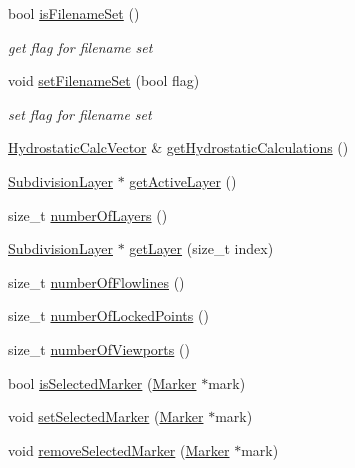 \begin{DoxyCompactItemize}
bool \hyperlink{classShipCAD_1_1ShipCADModel_af63013461d2ef6ee7221d72a42949d7c}{is\-Filename\-Set} ()
\begin{DoxyCompactList}\small\item\em get flag for filename set \end{DoxyCompactList}\item 
void \hyperlink{classShipCAD_1_1ShipCADModel_a960f3e97ef2aa847c9bb7cdc7731cd39}{set\-Filename\-Set} (bool flag)
\begin{DoxyCompactList}\small\item\em set flag for filename set \end{DoxyCompactList}\item 
\hyperlink{namespaceShipCAD_a0c7b012d8868cbb43871cf0bf303ccc6}{Hydrostatic\-Calc\-Vector} \& \hyperlink{classShipCAD_1_1ShipCADModel_aafc30dd7d6b9db4ccfc7bf1c4e2b3b11}{get\-Hydrostatic\-Calculations} ()
\item 
\hyperlink{classShipCAD_1_1SubdivisionLayer}{Subdivision\-Layer} $\ast$ \hyperlink{classShipCAD_1_1ShipCADModel_a5aa1e9aa14350f2e0980112a81613ca6}{get\-Active\-Layer} ()
\item 
size\-\_\-t \hyperlink{classShipCAD_1_1ShipCADModel_afb23b08b1014fc176ff864b8f154a84b}{number\-Of\-Layers} ()
\item 
\hyperlink{classShipCAD_1_1SubdivisionLayer}{Subdivision\-Layer} $\ast$ \hyperlink{classShipCAD_1_1ShipCADModel_ae13e425deb59f7b4f0c95cc02230f097}{get\-Layer} (size\-\_\-t index)
\item 
size\-\_\-t \hyperlink{classShipCAD_1_1ShipCADModel_afdb9bccb1cf9e3bf8aa853d81ff11d39}{number\-Of\-Flowlines} ()
\item 
size\-\_\-t \hyperlink{classShipCAD_1_1ShipCADModel_afb8cc5aaf19a6c1c687550fd9de1739e}{number\-Of\-Locked\-Points} ()
\item 
size\-\_\-t \hyperlink{classShipCAD_1_1ShipCADModel_a099d0530e99261318f6332220a331010}{number\-Of\-Viewports} ()
\item 
bool \hyperlink{classShipCAD_1_1ShipCADModel_a80076525a0aa65782988c3ddf97f37ce}{is\-Selected\-Marker} (\hyperlink{classShipCAD_1_1Marker}{Marker} $\ast$mark)
\item 
void \hyperlink{classShipCAD_1_1ShipCADModel_af638ed4ab8e64e89b0217cf727b48698}{set\-Selected\-Marker} (\hyperlink{classShipCAD_1_1Marker}{Marker} $\ast$mark)
\item 
void \hyperlink{classShipCAD_1_1ShipCADModel_a6801637e1f13a22b1ef3fc50e389f51e}{remove\-Selected\-Marker} (\hyperlink{classShipCAD_1_1Marker}{Marker} $\ast$mark)

\end{DoxyCompactItemize}
